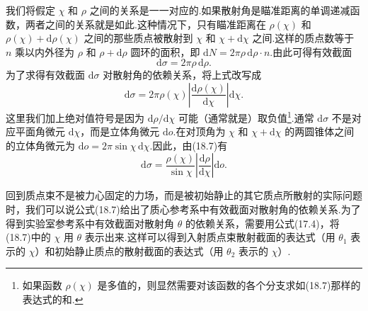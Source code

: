 我们将假定 $\chi$ 和 $\rho$ 之间的关系是一一对应的.如果散射角是瞄准距离的单调递减函数，两者之间的关系就是如此.这种情况下，只有瞄准距离在 $\rho(\chi)$ 和 $\rho(\chi)+\mathrm{d}\rho(\chi)$ 之间的那些质点被散射到 $\chi$ 和 $\chi+\mathrm{d}\chi$ 之间.这样的质点数等于 $n$ 乘以内外径为 $\rho$ 和 $\rho+\mathrm{d}\rho$ 圆环的面积，即 $\mathrm{d}N=2\pi\rho\,\mathrm{d}\rho\cdot n$.由此可得有效截面
\begin{equation}
  \mathrm{d}\sigma=2\pi\rho\,\mathrm{d}\rho.
\end{equation}
为了求得有效截面 $\mathrm{d}\sigma$ 对散射角的依赖关系，将上式改写成
\begin{equation}
  \mathrm{d}\sigma=2\pi\rho(\chi)
  \left|\frac{\mathrm{d}\rho(\chi)}{\mathrm{d}\chi}\right|\mathrm{d}\chi.
\end{equation}
这里我们加上绝对值符号是因为 $\mathrm{d}\rho/\mathrm{d}\chi$ 可能（通常就是）取负值\footnote{如果函数 $\rho(\chi)$ 是多值的，则显然需要对该函数的各个分支求如(18.7)那样的表达式的和.}.通常 $\mathrm{d}\sigma$ 不是对应平面角微元 $\mathrm{d}\chi$，而是立体角微元 $\mathrm{d}o$.在对顶角为 $\chi$ 和 $\chi+\mathrm{d}\chi$ 的两圆锥体之间的立体角微元为 $\mathrm{d}o=2\pi\sin\chi\,\mathrm{d}\chi$.因此，由(18.7)有
\begin{equation}
  \mathrm{d}\sigma=\frac{\rho(\chi)}{\sin\chi}
  \left|\frac{\mathrm{d}\rho}{\mathrm{d}\chi}\right|\mathrm{d}o.
\end{equation}

回到质点束不是被力心固定的力场，而是被初始静止的其它质点所散射的实际问题时，我们可以说公式(18.7)给出了质心参考系中有效截面对散射角的依赖关系.为了得到实验室参考系中有效截面对散射角 $\theta$ 的依赖关系，需要用公式(17.4)，将(18.7)中的 $\chi$ 用 $\theta$ 表示出来.这样可以得到入射质点束散射截面的表达式（用 $\theta_1$ 表示的 $\chi$）和初始静止质点的散射截面的表达式（用 $\theta_2$ 表示的 $\chi$）.

